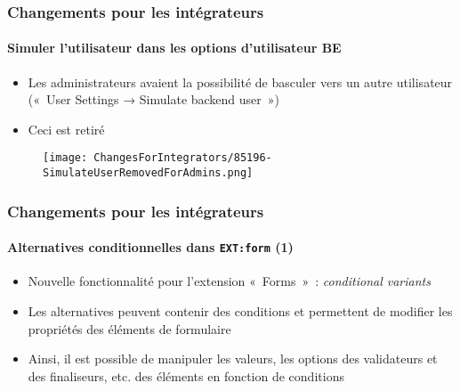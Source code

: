 
\begin{frame}[fragile]
	\frametitle{Changements pour les intégrateurs}
	\framesubtitle{Simuler l'utilisateur dans les options d'utilisateur BE}

	\begin{itemize}
		\item Les administrateurs avaient la possibilité de basculer vers un autre
			utilisateur («~User Settings → Simulate backend user~»)
		\item Ceci est retiré
	\end{itemize}

	\begin{figure}
		\texttt{[image: ChangesForIntegrators/85196-SimulateUserRemovedForAdmins.png]}
	\end{figure}

\end{frame}


\begin{frame}[fragile]
	\frametitle{Changements pour les intégrateurs}
	\framesubtitle{Alternatives conditionnelles dans \texttt{EXT:form} (1)}

	\begin{itemize}
		\item Nouvelle fonctionnalité pour l'extension «~Forms~»~: \textit{conditional variants}
		\item Les alternatives peuvent contenir des conditions et permettent de modifier les
			propriétés des éléments de formulaire
		\item Ainsi, il est possible de manipuler les valeurs, les options des validateurs et
			des finaliseurs, etc. des éléments en fonction de conditions

	\end{itemize}

\end{frame}


